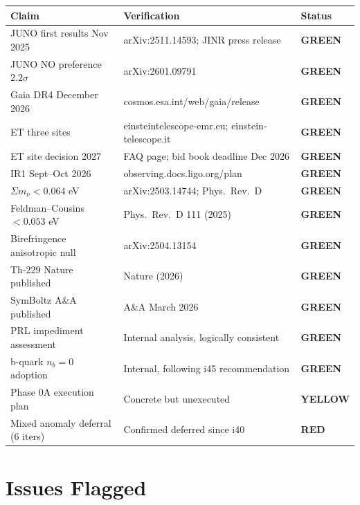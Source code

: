 \documentclass[11pt,a4paper]{article}
\newcommand{\GREEN}{\textcolor{dfdgreen}{\textbf{GREEN}}}
\newcommand{\YELLOW}{\textcolor{dfdyellow}{\textbf{YELLOW}}}
\newcommand{\RED}{\textcolor{dfdred}{\textbf{RED}}}
\begin{document}
\begin{center}
\begin{tabular}{lp{8cm}l}
\toprule
\textbf{Claim} & \textbf{Verification} & \textbf{Status} \\
\midrule
JUNO first results Nov 2025 & arXiv:2511.14593; JINR press release & \GREEN \\
JUNO NO preference $2.2\sigma$ & arXiv:2601.09791 & \GREEN \\
Gaia DR4 December 2026 & cosmos.esa.int/web/gaia/release & \GREEN \\
ET three sites & einsteintelescope-emr.eu; einstein-telescope.it & \GREEN \\
ET site decision 2027 & FAQ page; bid book deadline Dec 2026 & \GREEN \\
IR1 Sept--Oct 2026 & observing.docs.ligo.org/plan & \GREEN \\
$\Sigma m_\nu < 0.064$ eV & arXiv:2503.14744; Phys.\ Rev.\ D & \GREEN \\
Feldman--Cousins $< 0.053$ eV & Phys.\ Rev.\ D 111 (2025) & \GREEN \\
Birefringence anisotropic null & arXiv:2504.13154 & \GREEN \\
Th-229 Nature published & Nature (2026) & \GREEN \\
SymBoltz A\&A published & A\&A March 2026 & \GREEN \\
PRL impediment assessment & Internal analysis, logically consistent & \GREEN \\
b-quark $n_b = 0$ adoption & Internal, following i45 recommendation & \GREEN \\
Phase 0A execution plan & Concrete but unexecuted & \YELLOW \\
Mixed anomaly deferral (6 iters) & Confirmed deferred since i40 & \RED \\
\bottomrule
\end{tabular}
\end{center}

\section{Issues Flagged}
\end{document}
